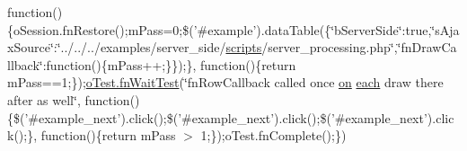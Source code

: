 \begin{DoxyCompactItemize}
function()\{o\+Session.\+fn\+Restore();m\+Pass=0;\$('\#example').data\+Table(\{\char`\"{}b\+Server\+Side\char`\"{}\+:true,\char`\"{}s\+Ajax\+Source\char`\"{}\+:\char`\"{}../../../examples/server\+\_\+side/\hyperlink{tinymce_8jquery_8dev_8js_a09066d4d580eeec222f858d588b4cdef}{scripts}/server\+\_\+processing.\+php\char`\"{},\char`\"{}fn\+Draw\+Callback\char`\"{}\+:function()\{m\+Pass++;\}\});\}, function()\{return m\+Pass==1;\});\hyperlink{onhold_24__server-side_2__zero__config_8js_ab25c4d596771c0133cdc45178ce72c3d}{o\+Test.\+fn\+Wait\+Test}(\char`\"{}fn\+Row\+Callback called once \hyperlink{fullpage_2plugin_8min_8js_a1cfa98b7fed2aaf9fee3b68dbb7f9497}{on} \hyperlink{fullpage_2plugin_8min_8js_a536422939f8cd6b5867a8fb424c3c02e}{each} draw there after as well\char`\"{}, function()\{\$('\#example\+\_\+next').click();\$('\#example\+\_\+next').click();\$('\#example\+\_\+next').click();\}, function()\{return m\+Pass $>$ 1;\});o\+Test.\+fn\+Complete();\})
\end{DoxyCompactItemize}


